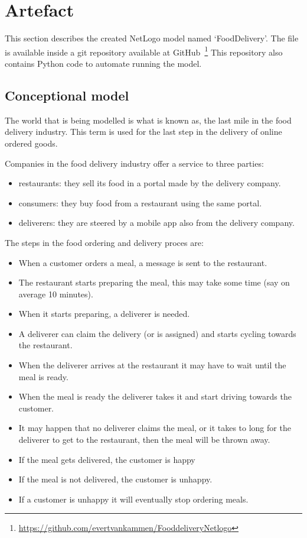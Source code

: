\section{Artefact}\label{sec:artefact}
This section describes the created NetLogo model named `FoodDelivery'.
The file is available inside a git repository available at GitHub~\footnote{\url{https://github.com/evertvankammen/FooddeliveryNetlogo}}
This repository also contains Python code to automate running the model.

\subsection{Conceptional model}\label{subsec:conceptional-model}
The world that is being modelled is what is known as, the last mile in the food delivery industry.
This term is used for the last step in the delivery of online ordered goods.

Companies in the food delivery industry offer a service to three parties:
\begin{itemize}
    \item restaurants: they sell its food in a portal made by the delivery company.
    \item consumers: they buy food from a restaurant using the same portal.
    \item deliverers: they are steered by a mobile app also from the delivery company.
\end{itemize}

The steps in the food ordering and delivery proces are:
\begin{itemize}
    \item When a customer orders a meal, a message is sent to the restaurant.
    \item The restaurant starts preparing the meal, this may take some time (say on average 10 minutes).
    \item When it starts preparing, a deliverer is needed.
    \item A deliverer can claim the delivery (or is assigned) and starts cycling towards the restaurant.
    \item When the deliverer arrives at the restaurant it may have to wait until the meal is ready.
    \item When the meal is ready the deliverer takes it and start driving towards the customer.
    \item It may happen that no deliverer claims the meal, or it takes to long for the deliverer to get to the restaurant,
then the meal will be thrown away.
    \item If the meal gets delivered, the customer is happy
    \item If the meal is not delivered, the customer is unhappy.
    \item If a customer is unhappy it will eventually stop ordering meals.
\end{itemize}

